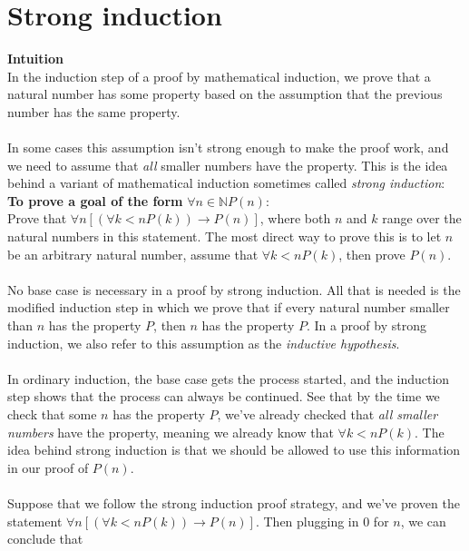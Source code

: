 \documentclass{report}
\theoremstyle{definition}
\begin{document}
\section{Strong induction}
\textbf{Intuition}\\
In the induction step of a proof by mathematical induction, we prove that a natural number has some property based on the assumption that the previous number has the same property.\\
\vspace{1mm}\\
In some cases this assumption isn't strong enough to make the proof work, and we need to assume that \textit{all} smaller numbers have the property. This is the idea behind a variant of mathematical
induction sometimes called \textit{strong induction}:
\vspace{1mm}\\
\indent\textbf{To prove a goal of the form }$\forall n\in\mathbb NP(n)$:\\
\indent Prove that $\forall n[(\forall k<nP(k))\to P(n)]$, where both $n$ and $k$ range over the natural numbers in this statement. The most direct way to prove this is to let $n$ be an arbitrary
natural number, assume that $\forall k<nP(k)$, then prove $P(n)$.\\
\vspace{1mm}\\
No base case is necessary in a proof by strong induction. All that is needed is the modified induction step in which we prove that if every natural number smaller than $n$ has the property
$P$, then $n$ has the property $P$. In a proof by strong induction, we also refer to this assumption as the \textit{inductive hypothesis}.\\
\vspace{1mm}\\
In ordinary induction, the base case gets the process started, and the induction step shows that the process can always be continued. See that by the time we check that some $n$ has the 
property $P$, we've already checked that \textit{all smaller numbers} have the property, meaning we already know that $\forall k<nP(k)$. The idea behind strong
induction is that we should be allowed to use this information in our proof of $P(n)$.\\
\vspace{1mm}\\
Suppose that we follow the strong induction proof strategy, and we've proven the statement
$\forall n[(\forall k<nP(k))\to P(n)]$. Then plugging in 0 for $n$, we can conclude that 
\end{document}
